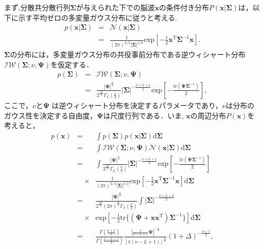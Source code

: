 \documentclass[journal]{IEEEtran}
\begin{document}
まず,分散共分散行列$\bm \Sigma$が与えられた下での脳波$\mathbf{x}$の条件付き分布$P(\mathbf{x}|\mathbf{\Sigma})$は，以下に示す平均ゼロの多変量ガウス分布に従うと考える.
%
\begin{eqnarray}
	p(\mathbf{x}|{\bm \Sigma}) &=& {\mathcal N}(\mathbf{x}|{\bm \Sigma}) \nonumber\\
&=& \frac{1}{(2\pi)^{L/2} |\mathbf{\Sigma}|^{1/2}} \mathrm{exp} \left[-\frac{1}{2}\mathbf{x}^\mathrm{T} {\bm \Sigma}^{-1} \mathbf{x}\right]. \label{eq:gauss_x}
\label{eq:p_x_sigma} %
\end{eqnarray}
%
$\mathbf{\Sigma}$の分布には，多変量ガウス分布の共役事前分布である逆ウィシャート分布${\mathcal {IW}}({\bm \Sigma}; \nu, {\bm \Psi})$を仮定する．
%
\begin{eqnarray}
	p({\bm \Sigma}) &=& {\mathcal {IW}}({\bm \Sigma};\nu,{\bm \Psi}) \nonumber\\
&=& \frac{|{\bm \Psi}|^{\frac{\nu}{2}}}{2^{\frac{\nu L}{2}} \Gamma_L \left(\frac{\nu}{2}\right)} |\bm \Sigma|^{-\frac{\nu+L+1}{2}} \mathrm{exp} \left[-\frac{\mathrm{tr}(\bm \Psi \bm \Sigma^{-1})}{2}\right],\label{eq:p_sigma} %
\end{eqnarray}
%
ここで，$\nu$と${\bm \Psi}$ は逆ウィシャート分布を決定するパラメータであり，$\nu$は分布のガウス性を決定する自由度，${\bm \Psi}$は尺度行列である．いま, $\mathbf{x}$の周辺分布$P(\mathbf{x})$を考えると，
\begin{eqnarray}
	p(\mathbf{x}) &=& \int p({\bm \Sigma})p(\mathbf{x}|{\bm \Sigma}) \mathrm{d}{\bm \Sigma} \nonumber \\
		&=& \int {\mathcal {IW}}({\bm \Sigma}; \nu, {\bm \Psi}) {\mathcal N}(\mathbf{x}|{\bm \Sigma}) \mathrm{d}{\bm \Sigma} \label{eq:marginal_x} \\ %
		&=& \int \frac{|{\bm \Psi}|^{\frac{\nu}{2}}}{2^{\frac{\nu L}{2}} \Gamma_L \left(\frac{\nu}{2}\right)} |\mathbf{\Sigma}|^{-\frac{\nu+L+1}{2}}\mathrm{exp} \left[-\frac{\mathrm{tr}(\bm \Psi \bm \Sigma^{-1})}{2}\right] \nonumber\\
&\quad \times&\frac{1}{(2\pi)^{L/2} |\mathbf{\Sigma}|^{1/2}} \mathrm{exp} \left[-\frac{1}{2}\mathbf{x}^\mathrm{T} {\bm \Sigma}^{-1} \mathbf{x}\right] \mathrm{d}{\bm \Sigma} \nonumber \\
		&=& \frac{|{\bm \Psi}|^{\frac{\nu}{2}}}{2^{\frac{\nu L}{2}} (2\pi)^\frac{L}{2} \Gamma_L \left(\frac{\nu}{2}\right)} \int |\mathbf{\Sigma}|^{-\frac{\nu+L+2}{2}}\nonumber\\
&\quad \times&\mathrm{exp} \left[-\frac{1}{2}\mathrm{tr}\{(\bm \Psi + \mathbf{x} \mathbf{x}^\mathrm{T})\bm \Sigma^{-1}\}\right] \mathrm{d}{\bm \Sigma} \nonumber \\
\label{eq:p_x}
&=& \frac{\Gamma(\frac{\nu+1}{2})}{\Gamma(\frac{\nu-L+1}{2})} \frac{|\frac{1}{\nu-L+1} {\bm \Psi}|^{-\frac{1}{2}}}{\left[\pi(\nu-L+1) \right]^{\frac{L}{2}}} (1+\Delta)^{-\frac{\nu+1}{2}} ,%
\end{eqnarray}
\end{document}
